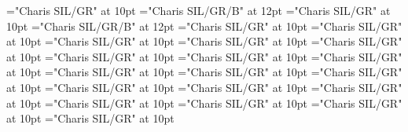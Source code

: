 \documentclass[gps1,twoside]{article}
\begin{document}
\font{}="Charis SIL/GR" at 10pt
\font\spanbzhheadwordreferencedentryreferencedentriescomplexformentryrefcomplexformentryrefsminorentrycomplex="Charis SIL/GR/B" at 12pt
\font\spanspanheadwordreferencedentryreferencedentriescomplexformentryrefcomplexformentryrefsminorentrycomplexbefore="Charis SIL/GR" at 10pt
\font\spanheadwordreferencedentryreferencedentriescomplexformentryrefcomplexformentryrefsminorentrycomplex="Charis SIL/GR/B" at 12pt
\font\spanspandefinitionorglossreferencedentryreferencedentriescomplexformentryrefcomplexformentryrefsminorentrycomplexbefore="Charis SIL/GR" at 10pt
\font\spandefinitionorglossreferencedentryreferencedentriescomplexformentryrefcomplexformentryrefsminorentrycomplexfirstchildbefore="Charis SIL/GR" at 10pt
\font\spanspansummarycomplexformentryrefcomplexformentryrefsminorentrycomplexbefore="Charis SIL/GR" at 10pt
\font\spansummarycomplexformentryrefcomplexformentryrefsminorentrycomplexfirstchildbefore="Charis SIL/GR" at 10pt
\font\nontrivialentryrootnontrivialentryrootnontrivialentryrootscomplexformentryrefcomplexformentryrefsminorentrycomplexbefore="Charis SIL/GR" at 10pt
\font\nontrivialentryrootscomplexformentryrefcomplexformentryrefsminorentrycomplexbefore="Charis SIL/GR" at 10pt
\font\spanspansummarydefinitionminorentrycomplexbefore="Charis SIL/GR" at 10pt
\font\spansummarydefinitionminorentrycomplexfirstchildbefore="Charis SIL/GR" at 10pt
\font\spansummarydefinitionminorentrycomplexlastchildafter="Charis SIL/GR" at 10pt
\font\spanspanvisiblecomplexformbackrefsminorentrycomplexbefore="Charis SIL/GR" at 10pt
\font\visiblecomplexformbackrefsminorentrycomplexbefore="Charis SIL/GR" at 10pt
\font\visiblecomplexformbackrefsminorentrycomplexafter="Charis SIL/GR" at 10pt
\font\complexformtypesvisiblecomplexformbackrefvisiblecomplexformbackrefsminorentrycomplexafter="Charis SIL/GR" at 10pt
\font\spanspanreverseabbrcomplexformtypecomplexformtypesvisiblecomplexformbackrefvisiblecomplexformbackrefsminorentrycomplexbefore="Charis SIL/GR" at 10pt
\font\spanspanheadwordvisiblecomplexformbackrefvisiblecomplexformbackrefsminorentrycomplexbefore="Charis SIL/GR" at 10pt
\font\spanspandefinitionorglossesvisiblecomplexformbackrefvisiblecomplexformbackrefsminorentrycomplexbefore="Charis SIL/GR" at 10pt
\font{}="Charis SIL/GR" at 10pt
\font\spanspanowningentrysummarydefinitionvisiblecomplexformbackrefvisiblecomplexformbackrefsminorentrycomplexbefore="Charis SIL/GR" at 10pt
\end{document}
